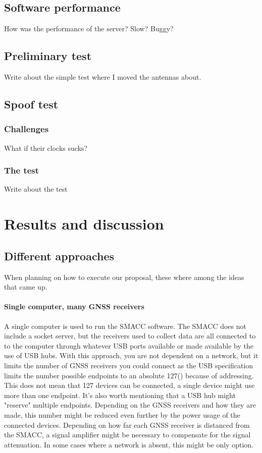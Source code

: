 \documentclass[12pt,english,a4paper]{report}
\begin{document}
\section{Software performance}
How was the performance of the server? Slow? Buggy?

\section{Preliminary test}
Write about the simple test where I moved the antennas about.

\section{Spoof test}
\subsection{Challenges}
What if their clocks sucks?

\subsection{The test}
Write about the test

\chapter{Results and discussion}\label{discussion}

\section{Different approaches}\label{da}
When planning on how to execute our proposal, these where among the ideas that came up. 

\subsubsection{Single computer, many GNSS receivers}
A single computer is used to run the SMACC software. The SMACC does not include a socket server, but the receivers used to collect data are all connected to to the computer through whatever USB ports available or made available by the use of USB hubs. With this approach, you are not dependent on a network, but it limits the number of GNSS receivers you could connect as the USB specification limits the number possible endpoints to an absolute 127(\cite[pp. 3]{USBTC}) because of addressing. This does not mean that 127 devices can be connected, a single device might use more than one endpoint. It's also worth mentioning that a USB hub might "reserve" multiple endpoints. Depending on the GNSS receivers and how they are made, this number might be reduced even further by the power usage of the connected devices. Depending on how far each GNSS receiver is distanced from the SMACC, a signal amplifier might be necessary to compensate for the signal attenuation. In some cases where a network is absent, this might be only option.
\end{document}

